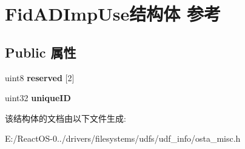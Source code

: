 \hypertarget{struct_fid_a_d_imp_use}{}\section{Fid\+A\+D\+Imp\+Use结构体 参考}
\label{struct_fid_a_d_imp_use}
\subsection*{Public 属性}
\begin{DoxyCompactItemize}
\item 
\mbox{\label{struct_fid_a_d_imp_use_a3ef25833f33bd87686e4dc88e90e92c1}} 
uint8 {\bfseries reserved} \mbox{[}2\mbox{]}
\item 
\mbox{\label{struct_fid_a_d_imp_use_a91aac0223dff423cfca9ed6e0aa85ef0}} 
uint32 {\bfseries unique\+ID}
\end{DoxyCompactItemize}


该结构体的文档由以下文件生成\+:\begin{DoxyCompactItemize}
\item 
E\+:/\+React\+O\+S-\/0../drivers/filesystems/udfs/udf\+\_\+info/osta\+\_\+misc.\+h\end{DoxyCompactItemize}
